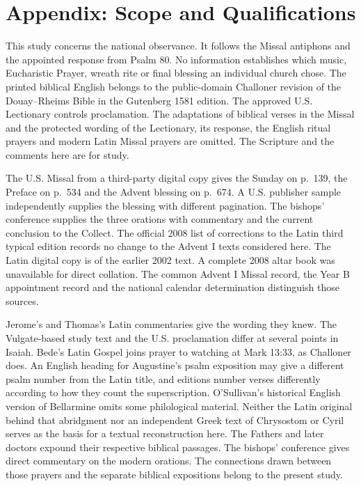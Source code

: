\section{Appendix: Scope and Qualifications}

This study concerns the national observance. It follows the Missal antiphons and the appointed response from Psalm 80. No information establishes which music, Eucharistic Prayer, wreath rite or final blessing an individual church chose. The printed biblical English belongs to the public-domain Challoner revision of the Douay--Rheims Bible in the Gutenberg 1581 edition. The approved U.S. Lectionary controls proclamation. The adaptations of biblical verses in the Missal and the protected wording of the Lectionary, its response, the English ritual prayers and modern Latin Missal prayers are omitted. The Scripture and the comments here are for study.

The U.S. Missal from a third-party digital copy gives the Sunday on p.~139, the Preface on p.~534 and the Advent blessing on p.~674. A U.S. publisher sample independently supplies the blessing with different pagination. The bishops' conference supplies the three orations with commentary and the current conclusion to the Collect. The official 2008 list of corrections to the Latin third typical edition records no change to the Advent I texts considered here. The Latin digital copy is of the earlier 2002 text. A complete 2008 altar book was unavailable for direct collation. The common Advent I Missal record, the Year B appointment record and the national calendar determination distinguish those sources.

Jerome's and Thomas's Latin commentaries give the wording they knew. The Vulgate-based study text and the U.S. proclamation differ at several points in Isaiah. Bede's Latin Gospel joins prayer to watching at Mark 13:33, as Challoner does. An English heading for Augustine's psalm exposition may give a different psalm number from the Latin title, and editions number verses differently according to how they count the superscription. O'Sullivan's historical English version of Bellarmine omits some philological material. Neither the Latin original behind that abridgment nor an independent Greek text of Chrysostom or Cyril serves as the basis for a textual reconstruction here. The Fathers and later doctors expound their respective biblical passages. The bishops' conference gives direct commentary on the modern orations. The connections drawn between those prayers and the separate biblical expositions belong to the present study.

